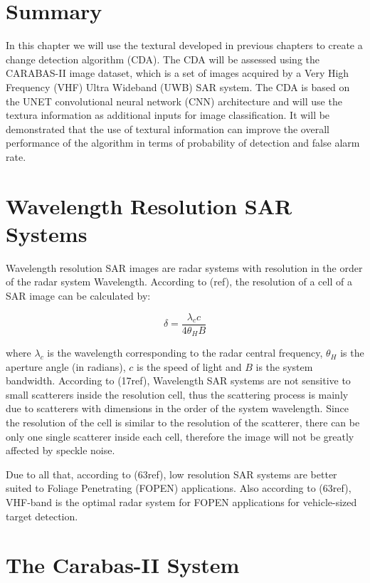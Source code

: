 \section{Summary}
In this chapter we will use the textural developed in previous chapters 
to create a change detection algorithm (CDA). The CDA will be assessed
using the CARABAS-II image dataset, which is a set of images acquired by a Very High Frequency (VHF) Ultra Wideband (UWB) SAR system.
The CDA is based on the UNET convolutional neural network (CNN) architecture and will use the 
textura information as additional inputs for image classification.
It will be demonstrated that the 
use of textural information can improve the overall performance of the algorithm
in terms of probability of detection and false alarm rate. 

\section{Wavelength Resolution SAR Systems}
Wavelength resolution SAR images are radar systems with resolution in the order of 
the radar system Wavelength. According to (ref), the resolution of a cell of a SAR image can be
calculated by:

\begin{equation}
    \delta = \frac{\lambda_c c}{4 \theta_H B}
\end{equation}

where $\lambda_c$ is the wavelength corresponding to the radar central frequency, $\theta_H$
is the aperture angle (in radians), $c$ is the speed of light and $B$ is the system bandwidth.
According to (17ref), Wavelength SAR systems are not sensitive to small scatterers inside the resolution cell,
thus the scattering process is mainly due to scatterers with dimensions in the order of the system wavelength.
Since the resolution of the cell is similar to the resolution of the scatterer, there can be only one single scatterer inside each cell, 
therefore the image will not be greatly affected by speckle noise.

Due to all that, according to (63ref), low resolution SAR systems are better suited to Foliage Penetrating (FOPEN) applications.
Also according to (63ref), VHF-band is the optimal radar system for FOPEN applications for vehicle-sized target detection.

\section{The Carabas-II System}


